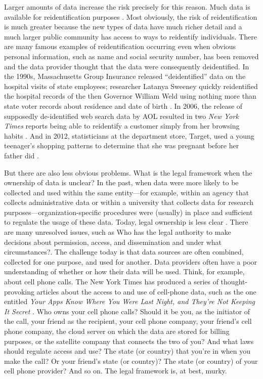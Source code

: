 \documentclass[]{krantz}
\begin{document}
Larger amounts of data increase the risk precisely for this reason. Much
data is available for reidentification purposes \citep{ohm2010broken}.
Most obviously, the risk of reidentification is much greater because the
new types of data have much richer detail and a much larger public
community has access to ways to reidentify individuals. There are many
famous examples of reidentification occurring even when obvious personal
information, such as name and social security number, has been removed
and the data provider thought that the data were consequently
deidentified. In the 1990s, Massachusetts Group Insurance released
``deidentified'' data on the hospital visits of state employees;
researcher Latanya Sweeney quickly reidentified the hospital records of
the then Governor William Weld using nothing more than state voter
records about residence and date of birth
\citep{sweeney2001computational}. In 2006, the release of supposedly
de-identified web search data by AOL resulted in two \emph{New York
Times} reports being able to reidentify a customer simply from her
browsing habits \citep{barbaro2006face}. And in 2012, statisticians at
the department store, Target, used a young teenager's shopping patterns
to determine that she was pregnant before her father did
\citep{hill2012target}.

But there are also less obvious problems. What is the legal framework
when the ownership of data is unclear? In the past, when data were more
likely to be collected and used within the same entity---for example,
within an agency that collects administrative data or within a
university that collects data for research
purposes---organization-specific procedures were (usually) in place and
sufficient to regulate the usage of these data. Today, legal ownership
is less clear \citep{lane2014}. There are many unresolved issues, such
as Who has the legal authority to make decisions about permission,
access, and dissemination and under what circumstances?. The challenge
today is that data sources are often combined, collected for one
purpose, and used for another. Data providers often have a poor
understanding of whether or how their data will be used. Think, for
example, about cell phone calls. The New York Times has produced a
series of thought-provoking articles about the access to and use of
cell-phone data, such as the one entitled \emph{Your Apps Know Where You
Were Last Night, and They're Not Keeping It Secret}
\citep{Valentino-DeVries}. Who owns your cell phone calls? Should it be
you, as the initiator of the call, your friend as the recipient, your
cell phone company, your friend's cell phone company, the cloud server
on which the data are stored for billing purposes, or the satellite
company that connects the two of you? And what laws should regulate
access and use? The state (or country) that you're in when you make the
call? Or your friend's state (or country)? The state (or country) of
your cell phone provider? And so on. The legal framework is, at best,
murky.
\end{document}
